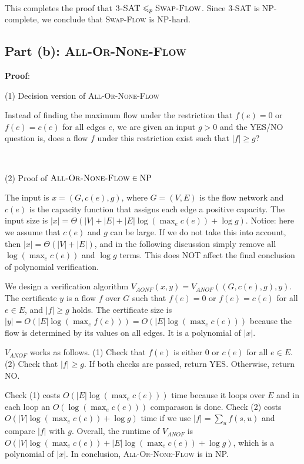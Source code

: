 \documentclass{article}
\begin{document}
~

This completes the proof that $\textsc{3-SAT}\leqslant_p\textsc{Swap-Flow}$. Since \textsc{3-SAT} is NP-complete, we conclude that \textsc{Swap-Flow} is NP-hard.

\subsection{Part (b): \textsc{All-Or-None-Flow}}
\noindent\textbf{Proof}:

\noindent(1) Decision version of \textsc{All-Or-None-Flow}

Instead of finding the maximum flow under the restriction that $f(e)=0$ or $f(e)=c(e)$ for all edges $e$, we are given an input $g>0$ and the YES/NO question is, does a flow $f$ under this restriction exist such that $|f|\geqslant g$?

~

\noindent(2) Proof of $\textsc{All-Or-None-Flow}\in\textup{NP}$

The input is $x=(G,c(e),g)$, where $G=(V,E)$ is the flow network and $c(e)$ is the capacity function that assigns each edge a positive capacity. The input size is $|x|=\Theta(|V|+|E|+|E|\log(\max_ec(e))+\log g)$. Notice: here we assume that $c(e)$ and $g$ can be large. If we do not take this into account, then $|x|=\Theta(|V|+|E|)$, and in the following discussion simply remove all $\log(\max_ec(e))$ and $\log g$ terms. This does NOT affect the final conclusion of polynomial verification.

We design a verification algorithm $V_{AONF}(x,y)=V_{ANOF}((G,c(e),g),y)$. The certificate $y$ is a flow $f$ over $G$ such that $f(e)=0$ or $f(e)=c(e)$ for all $e\in E$, and $|f|\geqslant g$ holds. The certificate size is $|y|=O(|E|\log(\max_ef(e)))=O(|E|\log(\max_ec(e)))$ because the flow is determined by its values on all edges. It is a polynomial of $|x|$.

$V_{ANOF}$ works as follows. (1) Check that $f(e)$ is either 0 or $c(e)$ for all $e\in E$. (2) Check that $|f|\geqslant g$. If both checks are passed, return YES. Otherwise, return NO.

Check (1) costs $O(|E|\log(\max_ec(e)))$ time because it loops over $E$ and in each loop an $O(\log(\max_ec(e)))$ comparason is done. Check (2) costs $O(|V|\log(\max_ec(e))+\log g)$ time if we use $|f|=\sum_uf(s,u)$ and compare $|f|$ with $g$. Overall, the runtime of $V_{ANOF}$ is $O(|V|\log(\max_ec(e))+|E|\log(\max_ec(e))+\log g)$, which is a polynomial of $|x|$. In conclusion, \textsc{All-Or-None-Flow} is in NP.
\end{document}

